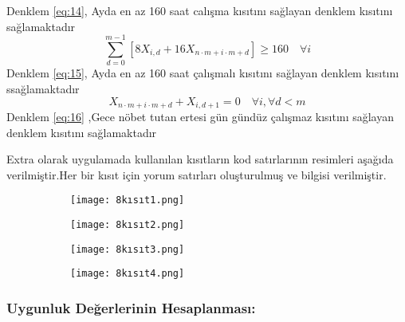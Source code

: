 \documentclass[12pt, a4paper]{article}
\begin{document}
\begin{flushleft}
\begin{equation}
\end{equation}
Denklem	  \ref{eq:14},	Ayda en az 160 saat calışma kısıtını sağlayan denklem kısıtını sağlamaktadır\\[20pt]
\begin{equation}
	\label{eq:15}
	\sum_{d=0}^{m-1} \left[ 8 X_{i,d} + 16 X_{n \cdot m + i \cdot m + d} \right] \geq 160 \quad \forall i
\end{equation}
Denklem	 \ref{eq:15}, Ayda en az 160 saat çalışmalı kısıtını sağlayan denklem kısıtını ssağlamaktadır \\[20pt]
\begin{equation}
	\label{eq:16}
	X_{n \cdot m + i \cdot m + d} + X_{i,d+1} = 0 \quad \forall i, \forall d < m
\end{equation}
Denklem	 \ref{eq:16} ,Gece nöbet tutan ertesi gün gündüz çalışmaz kısıtını sağlayan denklem kısıtını sağlamaktadır
\\[50pt]
\item Extra olarak uygulamada kullanılan  kısıtların  kod satırlarının resimleri  aşağıda verilmiştir.Her bir kısıt için yorum satırları oluşturulmuş ve bilgisi verilmiştir.
\begin{figure}[htbp]
	\centering
	\begin{subfigure}[b]{1\textwidth}
		\centering
		\texttt{[image: 8kısıt1.png]}
		
		\label{fig:resim1}
	\end{subfigure}
	\hfill
	\begin{subfigure}[b]{1.\textwidth}
		\centering
		\texttt{[image: 8kısıt2.png]}
		
		\label{fig:resim1}
	\end{subfigure}
	\hfill
	
\end{figure}
\newpage
\begin{figure}[htbp]
	\centering
	\begin{subfigure}[b]{1\textwidth}
		\centering
		\texttt{[image: 8kısıt3.png]}
		
		
	\end{subfigure}
	\hfill
	\begin{subfigure}[b]{1\textwidth}
		\centering
		\texttt{[image: 8kısıt4.png]}
		
		
	\end{subfigure}
	\hfill
	
\end{figure}
\clearpage

\subsubsection{Uygunluk Değerlerinin Hesaplanması: }


\end{flushleft}
\end{document}
